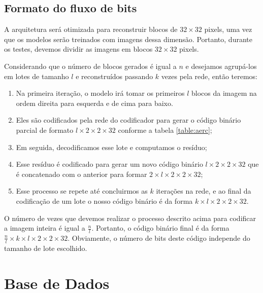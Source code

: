 


\subsection{Formato do fluxo de bits}

A arquitetura será otimizada para reconstruir blocos de $32 \times 32$ pixels, uma vez que os modelos serão treinados com imagens dessa dimensão. Portanto, durante os testes, devemos dividir as imagens em blocos $32 \times 32$ pixels. 

Considerando que o número de blocos gerados é igual a $n$ e desejamos agrupá-los em lotes de tamanho $l$ e reconstruídos passando $k$ vezes pela rede, então teremos:
\begin{enumerate}
	\item Na primeira iteração, o modelo irá tomar os primeiros $l$ blocos da imagem na ordem direita para esquerda e de cima para baixo. 	\item Eles são codificados pela rede do codificador para gerar o código binário parcial de formato $l \times 2 \times 2 \times 32$ conforme a tabela \ref{table:aerc};
	\item Em seguida, decodificamos esse lote e computamos o resíduo;
	\item  Esse resíduo é codificado para gerar um novo código binário $l \times 2 \times 2 \times 32$ que é concatenado com o anterior para formar $2 \times l \times 2 \times 2 \times 32$;
	\item Esse processo se repete até concluirmos as $k$ iterações na rede, e ao final da codificação de um lote o nosso código binário é da forma $k \times l \times 2 \times 2 \times 32$. 
\end{enumerate}

O número de vezes que devemos realizar o processo descrito acima para codificar a imagem inteira é igual a $\frac{n}{l}$. Portanto, o código binário final é da forma $\frac{n}{l} \times k \times l \times 2 \times 2 \times 32$. Obviamente, o número de bits deste código independe do tamanho de lote escolhido. 


\section {Base de Dados}

